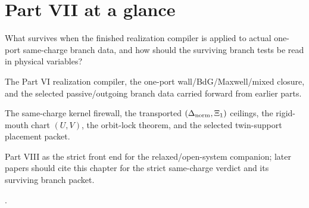 \section*{Part VII at a glance}

\begin{readermap}
\item[Primary question] What survives when the finished realization compiler is applied to actual one-port same-charge branch data, and how should the surviving branch tests be read in physical variables?
\item[Starting inputs] The Part VI realization compiler, the one-port wall/BdG/Maxwell/mixed closure, and the selected passive/outgoing branch data carried forward from earlier parts.
\item[Delivers] The same-charge kernel firewall, the transported \((\Delta_{\rm norm},\Xi_1)\) ceilings, the rigid-mouth chart \((U,V)\), the orbit-lock theorem, and the selected twin-support placement packet.
\item[Used by] Part VIII as the strict front end for the relaxed/open-system companion; later papers should cite this chapter for the strict same-charge verdict and its surviving branch packet.
\item[Result anchors] .
\end{readermap}

